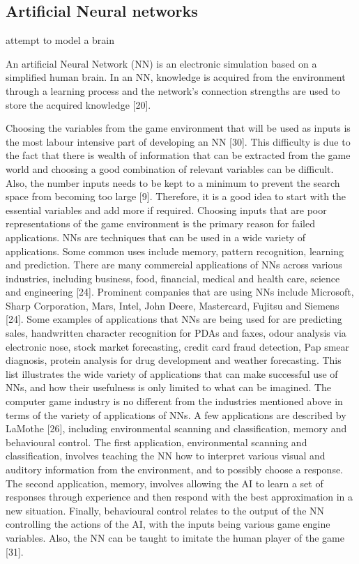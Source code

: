 \documentclass[a4paper,oneside]{report}
\begin{document}
\subsection{Artificial Neural networks}

attempt to model a brain

An artificial Neural Network (NN) is an electronic simulation based on a simplified human brain. In an NN, knowledge is acquired from the environment through a learning process and the network’s connection strengths are used to store the acquired knowledge [20].

Choosing the variables from the game environment that will be used as inputs is the most labour intensive part of developing an NN [30]. This difficulty is due to the fact that there is wealth of information that can be extracted from the game world and choosing a good combination of relevant variables can be difficult. Also, the number inputs needs to be kept to a minimum to prevent the search space from becoming too large [9]. Therefore, it is a good idea to start with the essential variables and add more if required. Choosing inputs that are poor representations of the game environment is the primary reason for failed applications.
NNs are techniques that can be used in a wide variety of applications. Some common uses include memory, pattern recognition, learning and prediction. There are many commercial applications of NNs across various industries, including business, food, financial, medical and health care, science and engineering [24]. Prominent companies that are using NNs include Microsoft, Sharp Corporation, Mars, Intel, John Deere, Mastercard, Fujitsu and Siemens [24]. Some examples of applications that NNs are being used for are predicting sales, handwritten character recognition for PDAs and faxes, odour analysis via electronic nose, stock market forecasting, credit card fraud detection, Pap smear diagnosis, protein analysis for drug development and weather forecasting. This list illustrates the wide variety of applications that can make successful use of NNs, and how their usefulness is only limited to what can be imagined.
The computer game industry is no different from the industries mentioned above in terms of the variety of applications of NNs. A few applications are described by LaMothe [26], including environmental scanning and classification, memory and behavioural control. The first application, environmental scanning and classification, involves teaching the NN how to interpret various visual and auditory information from the environment, and to possibly choose a response. The second application, memory, involves allowing the AI to learn a set of responses through experience and then respond with the best approximation in a new situation. Finally, behavioural control relates to the output of the NN controlling the actions of the AI, with the inputs being various game engine variables. Also, the NN can be taught to imitate the human player of the game [31].
\end{document}
